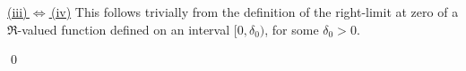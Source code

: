 \vskip 0.5cm
\noindent
\underline{(iii)\,$\Longleftrightarrow$\,(iv)}
\vskip 0.1cm
\noindent
This follows trivially from the definition of the right-limit at zero of a $\Re$-valued function defined
on an interval $[0,\delta_{0})$, for some $\delta_{0} > 0$.


\qed
